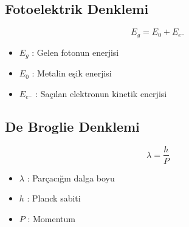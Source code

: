 \documentclass[a4paper, 11pt, titlepage]{article}
\begin{document}
\subsection{Fotoelektrik Denklemi}
\[
E_g = E_0 + E_{e^-}
\]
\begin{itemize}
  \item $E_g$ : Gelen fotonun enerjisi
  \item $E_0$ : Metalin eşik enerjisi
  \item $E_{e^-}$ : Saçılan elektronun kinetik enerjisi
\end{itemize}

\subsection{De Broglie Denklemi}
\[
\lambda = \frac{h}{P}
\]
\begin{itemize}
  \item $\lambda$ : Parçacığın dalga boyu
  \item $h$ : Planck sabiti
  \item $P$ : Momentum
\end{itemize}
\end{document}
